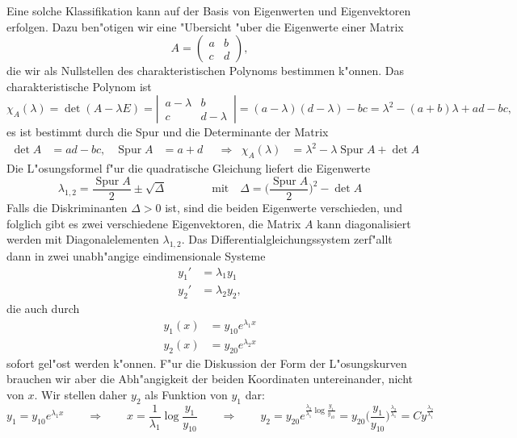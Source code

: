 Eine solche Klassifikation kann auf der Basis von Eigenwerten und
Eigenvektoren erfolgen.
Dazu ben"otigen wir eine "Ubersicht "uber die Eigenwerte einer
Matrix
\[
A=\begin{pmatrix}a&b\\c&d\end{pmatrix},
\]
die wir als Nullstellen des charakteristischen Polynoms bestimmen
k"onnen.
Das charakteristische Polynom ist
\[
\chi_A(\lambda)
=
\det(A-\lambda E)
=
\left|\,\begin{matrix}a-\lambda&b\\c&d-\lambda\end{matrix}\,\right|
=
(a-\lambda)(d-\lambda)-bc
=
\lambda^2-(a+b)\lambda + ad-bc,
\]
es ist bestimmt durch die Spur und die Determinante der Matrix
\[
\begin{aligned}
\det A&=ad -bc,
&
\operatorname{Spur}A&=a+d
&
&\Rightarrow
&
\chi_A(\lambda)&=\lambda^2-\lambda \operatorname{Spur}A+\det A
\end{aligned}
\]
Die L"osungsformel f"ur die quadratische Gleichung liefert die
Eigenwerte
\[
\lambda_{1,2}
=
\frac{\operatorname{Spur}A}2\pm\sqrt{\Delta}
\qquad
\qquad
\text{mit}\quad
\Delta = \biggl(\frac{\operatorname{Spur}A}2\biggr)^2 - \det A
\]
Falls die Diskriminanten $\Delta > 0$ ist, sind die beiden Eigenwerte
verschieden, und folglich gibt es zwei verschiedene Eigenvektoren,
die Matrix $A$ kann diagonalisiert werden mit Diagonalelementen
$\lambda_{1,2}$.  Das Differentialgleichungssystem zerf"allt dann
in zwei unabh"angige eindimensionale Systeme
\begin{align*}
y_1'&= \lambda_1 y_1\\
y_2'&= \lambda_2 y_2,
\end{align*}
die auch durch
\begin{align*}
y_1(x)&=y_{10} e^{\lambda_1 x}\\
y_2(x)&=y_{20} e^{\lambda_2 x}
\end{align*}
sofort gel"ost werden k"onnen.
F"ur die Diskussion der Form der L"osungskurven brauchen wir aber die
Abh"angigkeit der beiden Koordinaten untereinander, nicht von $x$.
Wir stellen daher $y_2$ als Funktion von $y_1$ dar:
\[
y_1=y_{10} e^{\lambda_1 x}
\qquad\Rightarrow\qquad
x=\frac1{\lambda_1}\log\frac{y_1}{y_{10}}
\qquad\Rightarrow\qquad
y_2
=
y_{20} e^{\frac{\lambda_2}{\lambda_1}\log\frac{y_1}{y_{10}}}
=
y_{20}\biggl(\frac{y_1}{y_{10}}\biggr)^{\frac{\lambda_2}{\lambda_1}}
=
Cy^{\frac{\lambda_2}{\lambda_1}}
\]
